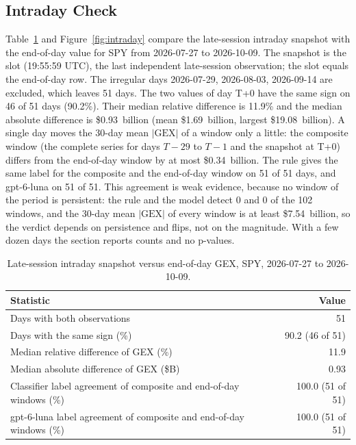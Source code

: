 \subsection{Intraday Check}
\label{sec:results:intraday}

Table~\ref{tab:intraday} and Figure~\ref{fig:intraday} compare the late-session intraday snapshot with the end-of-day value for SPY from 2026-07-27 to 2026-10-09.
The snapshot is the  slot (19:55:59 UTC), the last independent late-session observation; the  slot equals the end-of-day row. The irregular days 2026-07-29, 2026-08-03, 2026-09-14 are excluded, which leaves 51 days. The two values of day T+0 have the same sign on 46 of 51 days (90.2\%). Their median relative difference is 11.9\% and the median absolute difference is \$0.93~billion (mean \$1.69~billion, largest \$19.08~billion). A single day moves the 30-day mean $|\mathrm{GEX}|$ of a window only a little: the composite window (the complete series for days $T{-}29$ to $T{-}1$ and the snapshot at T+0) differs from the end-of-day window by at most \$0.34~billion. The rule gives the same label for the composite and the end-of-day window on 51 of 51 days, and gpt-6-luna on 51 of 51. This agreement is weak evidence, because no window of the period is persistent: the rule and the model detect 0 and 0 of the 102 windows, and the 30-day mean $|\mathrm{GEX}|$ of every window is at least \$7.54~billion, so the verdict depends on persistence and flips, not on the magnitude. With a few dozen days the section reports counts and no p-values.

\begin{table}[H]
\centering
\caption{Late-session intraday snapshot versus end-of-day GEX, SPY, 2026-07-27 to 2026-10-09.}
\label{tab:intraday}
\footnotesize
\begin{tabular}{@{}lr@{}}
\toprule
Statistic & Value \\
\midrule
Days with both observations & 51 \\
Days with the same sign (\%) & 90.2 (46 of 51) \\
Median relative difference of GEX (\%) & 11.9 \\
Median absolute difference of GEX (\$B) & 0.93 \\
Classifier label agreement of composite and end-of-day windows (\%) & 100.0 (51 of 51) \\
gpt-6-luna label agreement of composite and end-of-day windows (\%) & 100.0 (51 of 51) \\
\bottomrule
\end{tabular}
\end{table}


